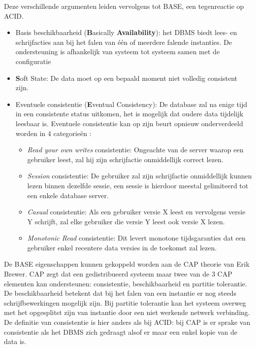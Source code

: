 Deze verschillende argumenten leiden vervolgens tot BASE, een tegenreactie op ACID. \noindent 
\begin{itemize}
 \item Basis beschikbaarheid (\textbf{B}asically \textbf{Availability}): het DBMS biedt lees- en schrijfacties aan bij het falen van één of meerdere falende instanties. De ondersteuning is afhankelijk van systeem tot systeem samen met de configuratie
 \item \textbf{S}oft State: De data moet op een bepaald moment niet volledig consistent zijn. 
 \item Eventuele consistentie (\textbf{E}ventual Consistency): De database zal na enige tijd in een consistente status uitkomen, het is mogelijk dat oudere data tijdelijk leesbaar is. Eventuele consistentie kan op zijn beurt opnieuw onderverdeeld worden in 4 categorieën \cite[slide 16]{lipcon2009design}:
 	\begin{itemize}
 		\item \textit{Read your own writes} consistentie: Ongeachte van de server waarop een gebruiker leest, zal hij zijn schrijfactie onmiddellijk correct lezen. 
 		\item \textit{Session} consistentie: De gebruiker zal zijn schrijfactie onmiddellijk kunnen lezen binnen dezelfde sessie, een sessie is hierdoor meestal gelimiteerd tot een enkele database server. 
 		\item \textit{Casual} consistentie: Als een gebruiker versie X leest en vervolgens versie Y schrijft, zal elke gebruiker die versie Y leest ook versie X lezen.
 		\item \textit{Monotonic Read} consistentie: Dit levert monotone tijdsgaranties dat een gebruiker enkel recentere data versies in de toekomst zal lezen. 
 	\end{itemize}
\end{itemize}
De BASE eigenschappen kunnen gekoppeld worden aan de CAP theorie van Erik Brewer\cite{Brewer:2000:TRD:343477.343502}. CAP zegt dat een gedistribueerd systeem maar twee van de 3 CAP elementen kan ondersteunen: consistentie, beschikbaarheid en partitie tolerantie. De beschikbaarheid betekent dat bij het falen van een instantie er nog steeds schrijfbewerkingen mogelijk zijn. Bij partitie tolerantie kan het systeem overweg met het opgesplitst zijn van instantie door een niet werkende netwerk verbinding. De definitie van consistentie is hier anders als bij ACID: bij CAP is er sprake van consistentie als het DBMS zich gedraagt alsof er maar een enkel kopie van de data is.

